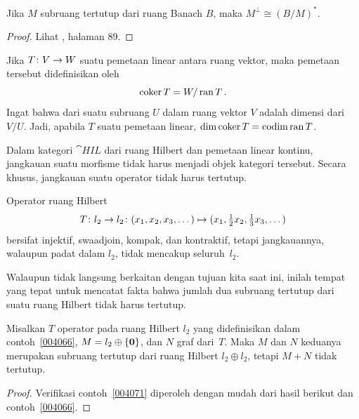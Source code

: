 \begin{prop} Jika $M$ subruang tertutup dari ruang Banach $B$, maka $M^\perp \cong (B/M)^*$.
\end{prop}

\begin{proof} Lihat \cite{Conway:1990}, halaman 89. \ns \end{proof}

\begin{defn} Jika $T\colon V \rightarrow W$ suatu pemetaan linear antara ruang vektor, maka
 pemetaan tersebut didefinisikan oleh
  \[ \operatorname{coker} T = W/ \operatorname{ran} T\,. \]
Ingat bahwa
 dari suatu subruang $U$ dalam ruang vektor $V$ adalah dimensi dari~$V/U$. Jadi,
apabila $T$ suatu pemetaan linear, $\dim\operatorname{coker} T = \operatorname{codim}\operatorname{ran} T$.
\end{defn}

Dalam kategori $\cat{HIL}$ dari ruang Hilbert dan pemetaan linear kontinu, jangkauan suatu
morfisme tidak harus menjadi objek kategori tersebut. Secara khusus, jangkauan suatu operator
tidak harus tertutup.

\begin{exam}\label{004066} Operator ruang Hilbert
   \[ T\colon l_2 \rightarrow l_2\colon (x_1,x_2,x_3,\dots) \mapsto
                                   (x_1, \tfrac12 x_2, \tfrac13 x_3, \dots) \]
bersifat injektif, swaadjoin, kompak, dan kontraktif,
tetapi jangkauannya, walaupun padat dalam $l_2$, tidak mencakup seluruh~$l_2$.
\end{exam}

Walaupun tidak langsung berkaitan dengan tujuan kita saat ini, inilah tempat yang tepat untuk mencatat
fakta bahwa jumlah dua subruang tertutup dari suatu ruang Hilbert tidak harus tertutup.

\begin{exam}\label{004071} Misalkan $T$ operator pada ruang Hilbert $l_2$ yang didefinisikan dalam
contoh~\ref{004066}, $M = l_2 \oplus \{\mathbf{0}\}$, dan $N$ graf dari~$T$. Maka $M$
dan $N$ keduanya merupakan subruang tertutup dari ruang Hilbert $l_2 \oplus l_2$, tetapi $M + N$
tidak tertutup.
\end{exam}

\begin{proof} Verifikasi contoh~\ref{004071} diperoleh dengan mudah dari hasil berikut
dan contoh~\ref{004066}. \ns
\end{proof}


